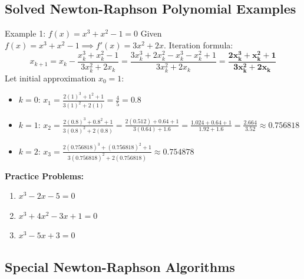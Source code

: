 \documentclass[11pt,a4paper]{article}
\begin{document}
\newpage

\subsection{Solved Newton-Raphson Polynomial Examples}

\begin{exbox}{Example 1: $f(x) = x^3 + x^2 - 1 = 0$}
Given $f(x) = x^3 + x^2 - 1 \implies f'(x) = 3x^2 + 2x$.
Iteration formula:
\begin{equation}
    x_{k+1} = x_k - \frac{x_k^3 + x_k^2 - 1}{3x_k^2 + 2x_k} = \frac{3x_k^3 + 2x_k^2 - x_k^3 - x_k^2 + 1}{3x_k^2 + 2x_k} = \mathbf{\frac{2x_k^3 + x_k^2 + 1}{3x_k^2 + 2x_k}}
\end{equation}
Let initial approximation $x_0 = 1$:
\begin{itemize}
    \item $k=0$: $x_1 = \frac{2(1)^3 + 1^2 + 1}{3(1)^2 + 2(1)} = \frac{4}{5} = \mathbf{0.8}$
    \item $k=1$: $x_2 = \frac{2(0.8)^3 + 0.8^2 + 1}{3(0.8)^2 + 2(0.8)} = \frac{2(0.512) + 0.64 + 1}{3(0.64) + 1.6} = \frac{1.024 + 0.64 + 1}{1.92 + 1.6} = \frac{2.664}{3.52} \approx \mathbf{0.756818}$
    \item $k=2$: $x_3 = \frac{2(0.756818)^3 + (0.756818)^2 + 1}{3(0.756818)^2 + 2(0.756818)} \approx \mathbf{0.754878}$
\end{itemize}

\textbf{Practice Problems:}
\begin{enumerate}
    \item $x^3 - 2x - 5 = 0$
    \item $x^3 + 4x^2 - 3x + 1 = 0$
    \item $x^3 - 5x + 3 = 0$
\end{enumerate}
\end{exbox}

\subsection{Special Newton-Raphson Algorithms}
\end{document}
